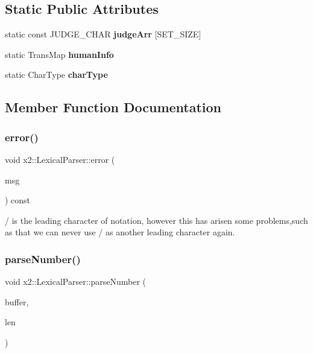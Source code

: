 \subsection*{Static Public Attributes}
\begin{DoxyCompactItemize}
\item 
static const J\+U\+D\+G\+E\+\_\+\+C\+H\+AR {\bfseries judge\+Arr} \mbox{[}S\+E\+T\+\_\+\+S\+I\+ZE\mbox{]}
\item 
\mbox{\label{classx2_1_1_lexical_parser_a35fe61724b0957fe7e7fc059aa3f9748}} 
static Trans\+Map {\bfseries human\+Info}
\item 
\mbox{\label{classx2_1_1_lexical_parser_a974b8f9c02b101ed6c5e58ec3be0b845}} 
static Char\+Type {\bfseries char\+Type}
\end{DoxyCompactItemize}


\subsection{Member Function Documentation}
\mbox{\label{classx2_1_1_lexical_parser_aa3c5fdf7dcce41c49671b5361992dc83}} 
\subsubsection{\texorpdfstring{error()}{error()}}
{\footnotesize\ttfamily void x2\+::\+Lexical\+Parser\+::error (\begin{DoxyParamCaption}\item[{const char $\ast$}]{msg }\end{DoxyParamCaption}) const}

/ is the leading character of notation, however this has arisen some problems,such as that we can never use / as another leading character again. \mbox{\label{classx2_1_1_lexical_parser_ad145a31ea89f2c203bb894226f37c424}} 
\subsubsection{\texorpdfstring{parse\+Number()}{parseNumber()}}
{\footnotesize\ttfamily void x2\+::\+Lexical\+Parser\+::parse\+Number (\begin{DoxyParamCaption}\item[{const char $\ast$}]{buffer,  }\item[{size\+\_\+t}]{len }\end{DoxyParamCaption})\hspace{0.3cm}{\ttfamily [delete]}}

